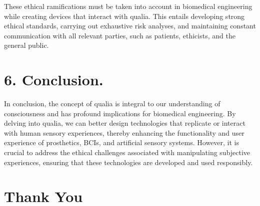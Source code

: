\documentclass{article}
\begin{document}
These ethical ramifications must be taken into account in biomedical engineering while creating devices that interact with qualia. This entails developing strong ethical standards, carrying out exhaustive risk analyses, and maintaining constant communication with all relevant parties, such as patients, ethicists, and the general public.



\section*{6.  Conclusion.}
In conclusion, the concept of qualia is integral to our understanding of consciousness and has profound implications for biomedical engineering. By delving into qualia, we can better design technologies that replicate or interact with human sensory experiences, thereby enhancing the functionality and user experience of prosthetics, BCIs, and artificial sensory systems. However, it is crucial to address the ethical challenges associated with manipulating subjective experiences, ensuring that these technologies are developed and used responsibly.



\section* {Thank You}
\end{document}

